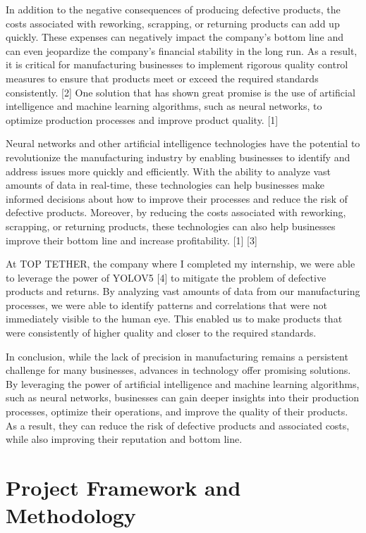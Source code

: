 \documentclass{report}
\begin{document}
In addition to the negative consequences of producing defective products, the costs associated with reworking, scrapping, or returning products can add up quickly. These expenses can negatively impact the company's bottom line and can even jeopardize the company's financial stability in the long run. As a result, it is critical for manufacturing businesses to implement rigorous quality control measures to ensure that products meet or exceed the required standards consistently. [2]
One solution that has shown great promise is the use of artificial intelligence and machine learning algorithms, such as neural networks, to optimize production processes and improve product quality. [1]

Neural networks and other artificial intelligence technologies have the potential to revolutionize the manufacturing industry by enabling businesses to identify and address issues more quickly and efficiently. With the ability to analyze vast amounts of data in real-time, these technologies can help businesses make informed decisions about how to improve their processes and reduce the risk of defective products. Moreover, by reducing the costs associated with reworking, scrapping, or returning products, these technologies can also help businesses improve their bottom line and increase profitability. [1]  [3]


At TOP TETHER, the company where I completed my internship, we were able to leverage the power of YOLOV5 [4] to mitigate the problem of defective products and returns. By analyzing vast amounts of data from our manufacturing processes, we were able to identify patterns and correlations that were not immediately visible to the human eye. This enabled us to make products that were consistently of higher quality and closer to the required standards.


In conclusion, while the lack of precision in manufacturing remains a persistent challenge for many businesses, advances in technology offer promising solutions. By leveraging the power of artificial intelligence and machine learning algorithms, such as neural networks, businesses can gain deeper insights into their production processes, optimize their operations, and improve the quality of their products. As a result, they can reduce the risk of defective products and associated costs, while also improving their reputation and bottom line.

\newpage


\chapter{Project Framework and Methodology}
\end{document}
